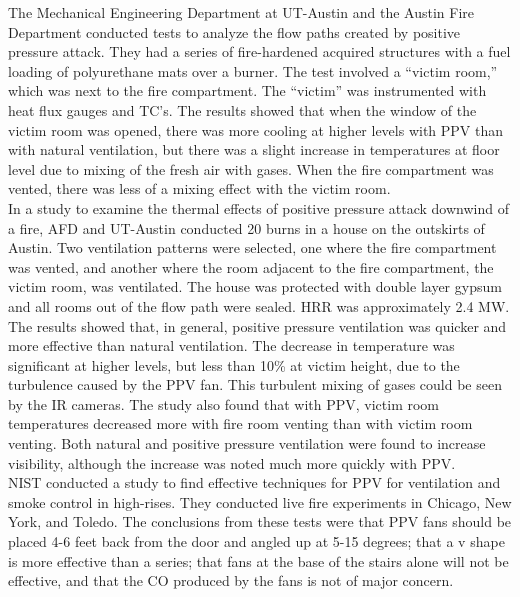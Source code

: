 \documentclass{article}
\begin{document}
The Mechanical Engineering Department at UT-Austin and the Austin Fire Department conducted tests to analyze the flow paths created by positive pressure attack. They had a series of fire-hardened acquired structures with a fuel loading of polyurethane mats over a burner. The test involved a “victim room,” which was next to the fire compartment. The “victim” was instrumented with heat flux gauges and TC’s.  The results showed that when the window of the victim room was opened, there was more cooling at higher levels with PPV than with natural ventilation, but there was a slight increase in temperatures at floor level due to mixing of the fresh air with gases. When the fire compartment was vented, there was less of a mixing effect with the victim room.\cite{UTAustinPPV}\\
	
In a study to examine the thermal effects of positive pressure attack downwind of a fire, AFD and UT-Austin conducted 20 burns in a house on the outskirts of Austin. Two ventilation patterns were selected, one where the fire compartment was vented, and another where the room adjacent to the fire compartment, the victim room, was ventilated. The house was protected with double layer gypsum and all rooms out of the flow path were sealed. HRR was approximately 2.4 MW. The results showed that, in general, positive pressure ventilation was quicker and more effective than natural ventilation. The decrease in temperature was significant at higher levels, but less than 10\% at victim height, due to the turbulence caused by the PPV fan. This turbulent mixing of gases could be seen by the IR cameras. The study also found that with PPV, victim room temperatures decreased more with fire room venting than with victim room venting. Both natural and positive pressure ventilation were found to increase visibility, although the increase was noted much more quickly with PPV. \cite{Lakshmin}\\
	
NIST conducted a study to find effective techniques for PPV for ventilation and smoke control in high-rises. They conducted live fire experiments in Chicago, New York, and Toledo. The conclusions from these tests were that PPV fans should be placed 4-6 feet back from the door and angled up at 5-15 degrees; that a v shape is more effective than a series; that fans at the base of the stairs alone will not be effective, and that the CO produced by the fans is not of major concern.\cite{KerberWorldSafety}\\
	
\end{document}
